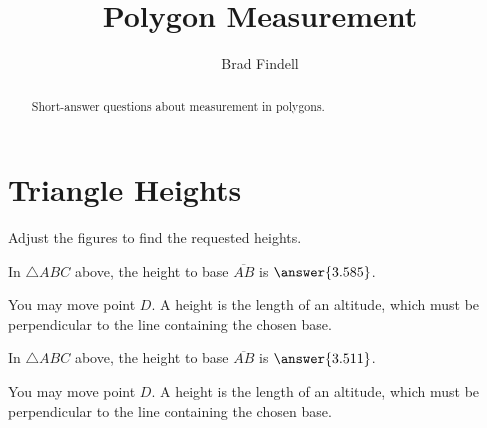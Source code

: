 \documentclass[nooutcomes]{ximera}
\title{Polygon Measurement}
\author{Brad Findell}
\begin{document}
\begin{abstract}
Short-answer questions about measurement in polygons. 
\end{abstract}
\maketitle

\section{Triangle Heights}
Adjust the figures to find the requested heights.  

\begin{center}  
\end{center}
\begin{problem}
In $\triangle ABC$ above, the height to base $\overline{AB}$ is $\answer{3.585}$.
\begin{hint}
You may move point $D$.  A height is the length of an altitude, which must be perpendicular to the line containing the chosen base.  
\end{hint}
\end{problem}

\begin{center}  
\end{center}
\begin{question}
In $\triangle ABC$ above, the height to base $\overline{AB}$ is $\answer{3.511}$.
\begin{hint}
You may move point $D$.  A height is the length of an altitude, which must be perpendicular to the line containing the chosen base.  
\end{hint}
\end{question}
\end{document}

